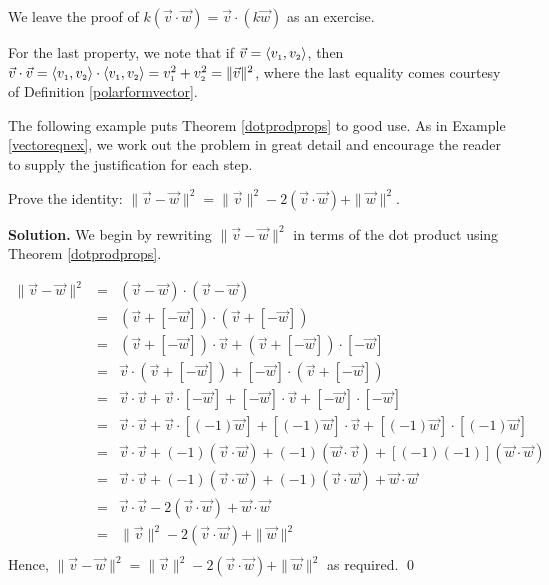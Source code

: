 \documentclass{ximera}
\begin{document}
We leave the proof of $k(\vec{v} \cdot \vec{w}) = \vec{v} \cdot (k \vec{w})$ as an exercise.

\smallskip

For the last property, we note that if  $\vec{v} = \left<v_{\mbox{\tiny $1$}},v_{\mbox{\tiny $2$}}\right>$, then $\vec{v} \cdot \vec{v} = \left<v_{\mbox{\tiny $1$}},v_{\mbox{\tiny $2$}}\right> \cdot \left<v_{\mbox{\tiny $1$}},v_{\mbox{\tiny $2$}}\right> = v_{\mbox{\tiny $1$}}^2 + v_{\mbox{\tiny $2$}}^2 = \|\vec{v}\|^2$, where the last equality comes courtesy of Definition \ref{polarformvector}.

\smallskip

The following example puts Theorem \ref{dotprodprops} to good use.  As in Example \ref{vectoreqnex}, we work out the problem in great detail and encourage the reader to supply the justification for each step.

\begin{example}  \label{dotprodpropex}  Prove the identity:  $\| \vec{v} - \vec{w} \|^2 =  \|\vec{v}\|^2  -2 (\vec{v}\cdot\vec{w}) + \|\vec{w}\|^2$.

\smallskip

{\bf Solution.} We begin by rewriting  $\| \vec{v} - \vec{w} \|^2$ in terms of the dot product using Theorem \ref{dotprodprops}.

\[ \begin{array}{rcl}

\| \vec{v} - \vec{w} \|^2 & = & (\vec{v} - \vec{w}) \cdot (\vec{v} - \vec{w})  \\ [3pt]
													& = & (\vec{v} + [-\vec{w}]) \cdot (\vec{v} + [-\vec{w}]) \\ [3pt]										
													& = &  (\vec{v} + [-\vec{w}]) \cdot \vec{v}  +(\vec{v} + [-\vec{w}]) \cdot [-\vec{w}]  \\ [3pt]		
													& = & \vec{v} \cdot (\vec{v} + [-\vec{w}])  + [-\vec{w}] \cdot (\vec{v} + [-\vec{w}]) \\ [3pt]
													& = & \vec{v} \cdot \vec{v} + \vec{v} \cdot [-\vec{w}] + [-\vec{w}]\cdot \vec{v} + [-\vec{w}]\cdot[-\vec{w}] \\ [3pt]
													& = & \vec{v} \cdot \vec{v} + \vec{v} \cdot [(-1)\vec{w}] + [(-1)\vec{w}]\cdot \vec{v} + [(-1)\vec{w}]\cdot[(-1)\vec{w}] \\ [3pt]	
													& = & \vec{v} \cdot \vec{v} + (-1)(\vec{v} \cdot \vec{w}) + (-1)(\vec{w} \cdot \vec{v}) + [(-1)(-1)](\vec{w}\cdot\vec{w}) \\ [3pt]	
													& = & \vec{v} \cdot \vec{v} + (-1)(\vec{v} \cdot \vec{w}) + (-1)(\vec{v} \cdot \vec{w}) + \vec{w}\cdot\vec{w} \\ [3pt]
												  & = & \vec{v} \cdot \vec{v} -2(\vec{v} \cdot \vec{w}) + \vec{w}\cdot\vec{w} \\ [3pt]
													& = & \|\vec{v}\|^2-2(\vec{v} \cdot \vec{w}) + \|\vec{w}\|^2 \\ \end{array} \]
Hence,  $\| \vec{v} - \vec{w} \|^2 =  \|\vec{v}\|^2  -2 (\vec{v}\cdot\vec{w}) + \|\vec{w}\|^2$ as required.  \qed

\end{example} 
\end{document}

